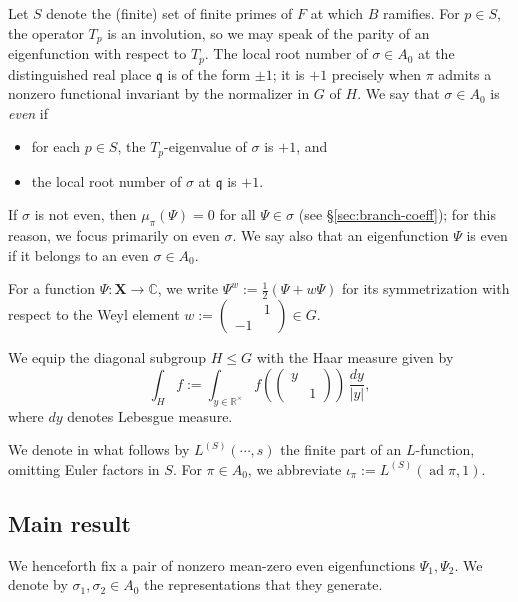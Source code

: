 \documentclass[reqno,10pt]{amsart}
\theoremstyle{plain} %
\theoremstyle{definition}
\theoremstyle{plain} %
\theoremstyle{remark}
\theoremstyle{itplain} %
\theoremstyle{remark} %
\renewcommand{\leq}{\leqslant}
\numberwithin{equation}{section}
\DeclareMathOperator{\ad}{ad}
\def\p{{p}}
\begin{document}
Let $S$ denote the (finite) set of finite primes of $F$ at which $B$ ramifies.  For $\p \in S$, the operator $T_{\p}$ is an involution, so we may speak of the parity of an eigenfunction with respect to $T_{\p}$.  The local root number of $\sigma \in A_0$ at the distinguished real place $\mathfrak{q}$ is of the form $\pm 1$; it is $+1$ precisely when $\pi$ admits a nonzero functional invariant by the normalizer in $G$ of $H$.
We say that $\sigma \in A_0$ is \emph{even} if
\begin{itemize}
\item for each $p \in S$, the $T_p$-eigenvalue of $\sigma$ is $+1$, and
\item the local root number of $\sigma$ at $\mathfrak{q}$ is $+1$.
\end{itemize}
If $\sigma$ is not even, then $\mu_\pi(\Psi) = 0$ for all $\Psi \in \sigma$ (see \S\ref{sec:branch-coeff}); for this reason, we focus primarily on even $\sigma$.  We say also that an eigenfunction $\Psi$ is even if it belongs to an even $\sigma \in A_0$.

For a function $\Psi : \mathbf{X} \rightarrow \mathbb{C}$, we write $\Psi^w := \frac{1}{2} (\Psi + w \Psi)$ for its symmetrization with respect to the Weyl element $w := \begin{pmatrix}
  & 1 \\
  -1 &
\end{pmatrix} \in G$.

We equip the diagonal subgroup $H \leq G$ with the Haar measure given by
\[
  \int_H f := \int_{y \in \mathbb{R}^\times} f (\begin{pmatrix}
    y &   \\
    & 1
  \end{pmatrix}) \, \frac{d y}{|y|},
\]
where $d y$ denotes Lebesgue measure.

We denote in what follows by $L^{(S)}(\dotsb,s)$ the finite part of an $L$-function, omitting Euler factors in $S$.  For $\pi \in A_0$, we abbreviate $\iota_{\pi} := L^{(S)}(\ad \pi,1)$.

\subsection{Main result}\label{sec:main-result}
We henceforth fix a pair of nonzero mean-zero even eigenfunctions $\Psi_1, \Psi_2$.  We denote by $\sigma_1, \sigma_2 \in A_0$ the representations that they generate.
\end{document}
